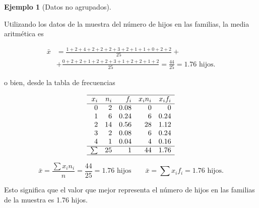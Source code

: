 \documentclass[
  a4paper,
]{scrreport}
\theoremstyle{plain}
\theoremstyle{definition}
\newtheorem{example}{Ejemplo}[chapter]
\theoremstyle{definition}
\theoremstyle{remark}
\begin{document}
\begin{example}[Datos no
agrupados]\protect\hypertarget{exm-media-datos-no-agrupados}{}\label{exm-media-datos-no-agrupados}

Utilizando los datos de la muestra del número de hijos en las familias,
la media aritmética es

\begin{align*}
\bar{x} &= \frac{1+2+4+2+2+2+3+2+1+1+0+2+2}{25}+\\
 &+\frac{0+2+2+1+2+2+3+1+2+2+1+2}{25} = \frac{44}{25} = 1.76 \mbox{ hijos}.
\end{align*}

o bien, desde la tabla de frecuencias

\[
\begin{array}{rrrrr}
\hline
x_i & n_i & f_i & x_in_i & x_if_i\\
\hline
0 & 2 & 0.08 & 0 & 0\\
1 & 6 & 0.24 & 6 & 0.24\\
2 & 14 & 0.56 & 28 & 1.12\\
3 & 2  & 0.08 & 6 & 0.24\\
4 & 1 & 0.04 & 4 & 0.16 \\
\hline
\sum & 25 & 1 & 44 & 1.76 \\
\hline
\end{array}
\]

\[
\bar{x} = \frac{\sum x_in_i}{n} = \frac{44}{25}= 1.76 \mbox{ hijos}\qquad \bar{x}=\sum{x_if_i} = 1.76 \mbox{ hijos}.
\]

Esto significa que el valor que mejor representa el número de hijos en
las familias de la muestra es 1.76 hijos.

\end{example}
\end{document}
